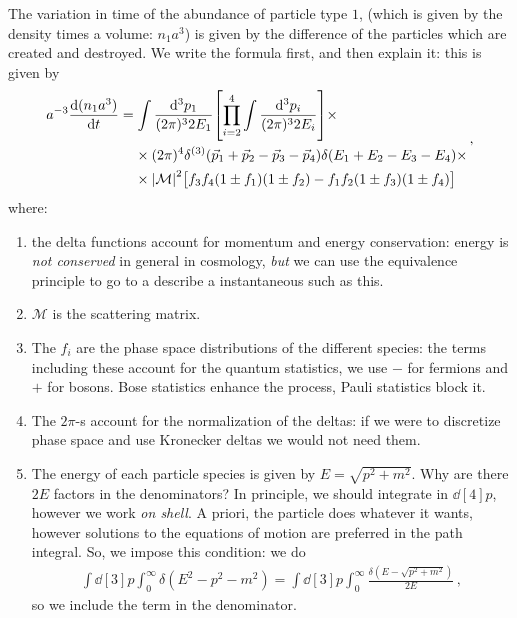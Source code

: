 \documentclass[main.tex]{subfiles}
\begin{document}
The variation in time of the abundance of particle type \(1\), (which is given by the density times a volume: \(n_1 a^3\)) is given by the difference of the particles which are created and destroyed.
We write the formula first, and then explain it: this is given by
%
\begin{align}
\begin{split}
a^{-3} \dv{(n_1 a^3)}{t}
&= \int \frac{ \dd[3]{p_{1}} }{(2 \pi )^3 2 E_1} \qty[\prod_{i=2}^{4}
\int \frac{ \dd[3]{p_{i}} }{(2 \pi )^3 2 E_i}] \times \\
&\phantom{=}\ 
\times (2 \pi )^{4} \delta^{(3)} (\vec{p}_{1} + \vec{p}_{2} - \vec{p}_{3} - \vec{p}_{4})
\delta (E_1 + E_2 - E_3 - E_4 )  \times \\
&\phantom{=}\ 
\times 
\abs{\mathcal{M}}^2
\qty[f_3 f_4 \qty(1 \pm f_1 ) \qty(1 \pm f_2 ) - f_1 f_2 \qty(1 \pm f_3 ) \qty(1 \pm f_4 )]
\end{split}
\,,
\end{align}
%
where:
\begin{enumerate}
  \item the delta functions account for momentum and energy conservation: energy is \emph{not conserved} in general in cosmology, \emph{but} we can use the equivalence principle to go to a  describe a instantaneous such as this.
  \item \(\mathcal{M}\) is the scattering matrix. 
  \item The \(f_{i}\) are the phase space distributions of the different species: the terms including these account for the quantum statistics, we use \(-\) for fermions and \(+\) for bosons. Bose statistics enhance the process, Pauli statistics block it. 
  \item The \(2\pi \)-s account for the normalization of the deltas: if we were to discretize phase space and use Kronecker deltas we would not need them. 
  \item The energy of each particle species is given by  \(E = \sqrt{p^2+m^2}\). 
  Why are there \(2E\) factors in the denominators? In principle, we should integrate in \(\dd[4]{p}\), however we work \emph{on shell}. A priori, the particle does whatever it wants, however solutions to the equations of motion are preferred in the path integral. So, we impose this condition: we do 
  \begin{align}
  \int \dd[3]{p} \int_{0}^{ \infty } \delta (E^2- p^2-m^2) 
  = \int \dd[3]{p} \int_{0}^{ \infty } \frac{ \delta (E - \sqrt{p^2+m^2})}{2E}
  \,,
  \end{align}
  so we include the term in the denominator. 
\end{enumerate}
\end{document}
